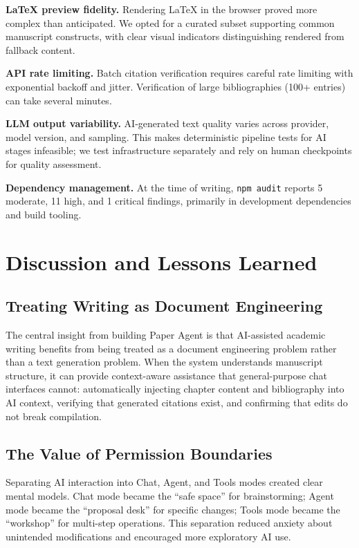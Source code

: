 \documentclass[11pt,a4paper]{article}
\newcommand{\software}{Paper Agent}
\begin{document}
\textbf{\LaTeX{} preview fidelity.} Rendering \LaTeX{} in the browser proved
more complex than anticipated. We opted for a curated subset supporting common
manuscript constructs, with clear visual indicators distinguishing rendered from
fallback content.

\textbf{API rate limiting.} Batch citation verification requires careful rate
limiting with exponential backoff and jitter. Verification of large
bibliographies (100+ entries) can take several minutes.

\textbf{LLM output variability.} AI-generated text quality varies across
provider, model version, and sampling. This makes deterministic pipeline tests
for AI stages infeasible; we test infrastructure separately and rely on human
checkpoints for quality assessment.

\textbf{Dependency management.} At the time of writing, \texttt{npm audit}
reports 5 moderate, 11 high, and 1 critical findings, primarily in development
dependencies and build tooling.

\section{Discussion and Lessons Learned}

\subsection{Treating Writing as Document Engineering}

The central insight from building \software{} is that AI-assisted academic
writing benefits from being treated as a document engineering problem rather
than a text generation problem. When the system understands manuscript
structure, it can provide context-aware assistance that general-purpose chat
interfaces cannot: automatically injecting chapter content and bibliography
into AI context, verifying that generated citations exist, and confirming that
edits do not break compilation.

\subsection{The Value of Permission Boundaries}

Separating AI interaction into Chat, Agent, and Tools modes created clear
mental models. Chat mode became the ``safe space'' for brainstorming; Agent
mode became the ``proposal desk'' for specific changes; Tools mode became the
``workshop'' for multi-step operations. This separation reduced anxiety about
unintended modifications and encouraged more exploratory AI use.
\end{document}
